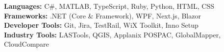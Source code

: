 
\textbf{Languages:} C\#, MATLAB, TypeScript, Ruby, Python, HTML, CSS\\
\textbf{Frameworks:} .NET (Core \& Framework), WPF, Next.js, Blazor \\
\textbf{Developer Tools:} Git, Jira, TestRail, WiX Toolkit, Inno Setup \\
\textbf{Industry Tools:} LASTools, QGIS, Applanix POSPAC, GlobalMapper, CloudCompare